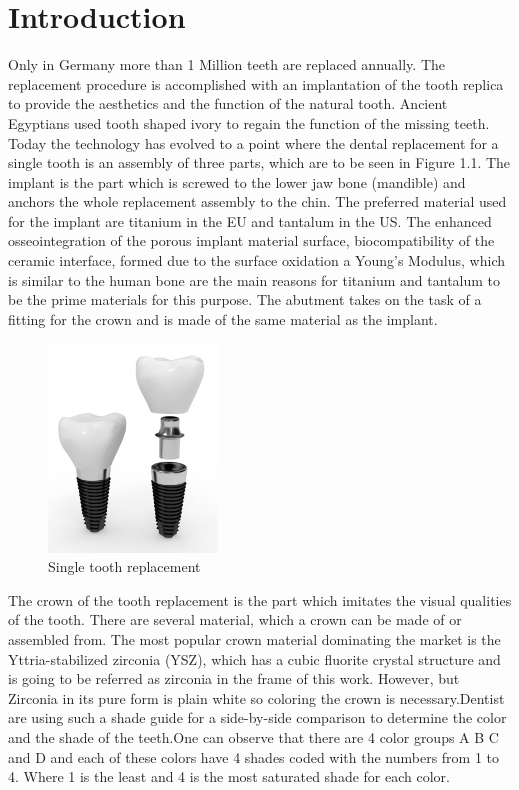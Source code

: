 \cleardoublepage
{}


\chapter{Introduction}
\label{sec:problemstellung}
 Only in Germany more than 1 Million teeth are replaced annually. The replacement procedure is accomplished with an implantation of the tooth replica to provide the aesthetics and the function of the natural tooth. Ancient Egyptians used tooth shaped ivory to regain the function of the missing teeth. Today the technology has evolved to a point where the dental replacement for a single tooth is an assembly of three parts, which  are to be seen in Figure 1.1. The implant is the part which is screwed to the lower jaw bone (mandible) and anchors the whole replacement assembly to the chin. The preferred material used for the implant are titanium in the EU and tantalum in the US. The enhanced osseointegration of the porous implant material surface, biocompatibility of the ceramic interface, formed due to the surface oxidation a Young's Modulus, which is similar to the human bone are the main reasons for titanium and tantalum to be the prime materials for this purpose. The abutment takes on the task of a fitting  for the crown and is made of the same material as the implant.
  \begin{figure}[h]
 	\centering
 	\includegraphics[width=0.4\textwidth]{grafiken/implant.png}
 	\caption{Single tooth replacement}
 	\label{fig:bild1}
 \end{figure} 
 
 The crown of the tooth replacement is the part which imitates the visual qualities of the tooth. There are several material, which a crown can be made of or assembled from. The most popular crown material dominating the market is the Yttria-stabilized zirconia (YSZ), which has a cubic fluorite crystal structure and is going to be referred as zirconia in the frame of this work. However, but Zirconia in its pure form is plain white so coloring the crown is necessary.Dentist are using such a shade guide for a side-by-side comparison to determine the color and the shade of the teeth.One can observe that there are 4 color groups A B C and D and each of these colors have 4 shades coded with the numbers from 1 to 4. Where 1 is the least and 4 is the most saturated shade for each color. 
 


